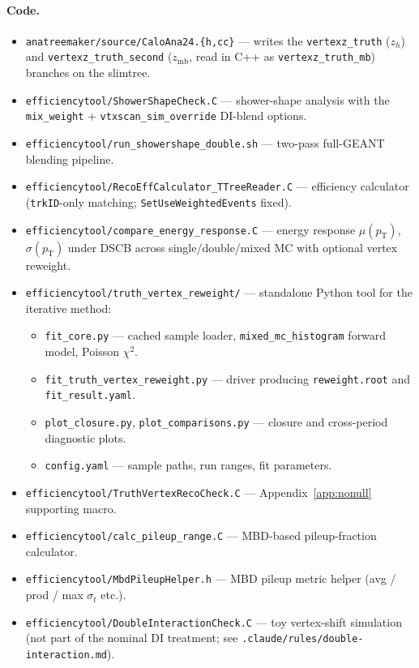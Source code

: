\documentclass[11pt,a4paper]{article}
\newcommand{\pT}{\ensuremath{p_{\text{T}}}\xspace}
\begin{document}
\paragraph{Code.}
\begin{itemize}\setlength\itemsep{1pt}
\item \texttt{anatreemaker/source/CaloAna24.\{h,cc\}} --- writes the
  \texttt{vertexz\_truth} ($z_h$) and
  \texttt{vertexz\_truth\_second} ($z_\mathrm{mb}$, read in C++ as
  \texttt{vertexz\_truth\_mb}) branches on the slimtree.
\item \texttt{efficiencytool/ShowerShapeCheck.C} --- shower-shape
  analysis with the \texttt{mix\_weight} +
  \texttt{vtxscan\_sim\_override} DI-blend options.
\item \texttt{efficiencytool/run\_showershape\_double.sh} ---
  two-pass full-GEANT blending pipeline.
\item \texttt{efficiencytool/RecoEffCalculator\_TTreeReader.C} ---
  efficiency calculator (\texttt{trkID}-only matching;
  \texttt{SetUseWeightedEvents} fixed).
\item \texttt{efficiencytool/compare\_energy\_response.C} ---
  energy response $\mu(\pT)$, $\sigma(\pT)$ under DSCB across
  single/double/mixed MC with optional vertex reweight.
\item \texttt{efficiencytool/truth\_vertex\_reweight/} --- standalone
  Python tool for the iterative method:
  \begin{itemize}\setlength\itemsep{0pt}
  \item \texttt{fit\_core.py} --- cached sample loader,
    \texttt{mixed\_mc\_histogram} forward model, Poisson $\chi^2$.
  \item \texttt{fit\_truth\_vertex\_reweight.py} --- driver
    producing \texttt{reweight.root} and \texttt{fit\_result.yaml}.
  \item \texttt{plot\_closure.py}, \texttt{plot\_comparisons.py} ---
    closure and cross-period diagnostic plots.
  \item \texttt{config.yaml} --- sample paths, run ranges, fit
    parameters.
  \end{itemize}
\item \texttt{efficiencytool/TruthVertexRecoCheck.C} ---
  Appendix~\ref{app:nonull} supporting macro.
\item \texttt{efficiencytool/calc\_pileup\_range.C} --- MBD-based
  pileup-fraction calculator.
\item \texttt{efficiencytool/MbdPileupHelper.h} --- MBD pileup
  metric helper (avg / prod / max $\sigma_t$ etc.).
\item \texttt{efficiencytool/DoubleInteractionCheck.C} --- toy
  vertex-shift simulation (not part of the nominal DI treatment;
  see \texttt{.claude/rules/double-interaction.md}).
\end{itemize}
\end{document}
